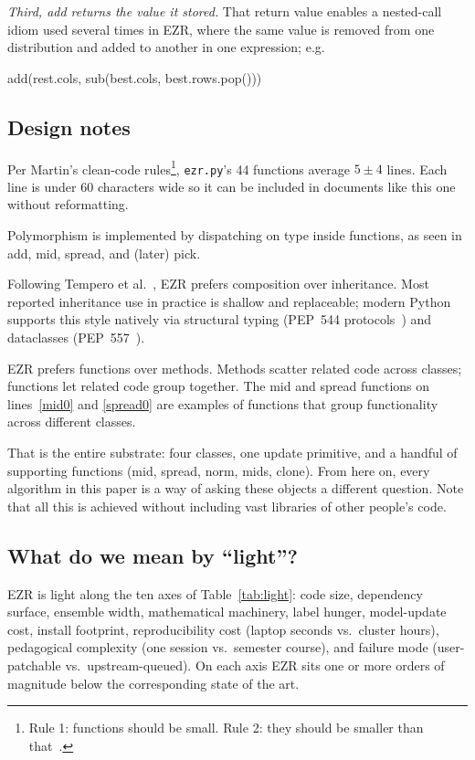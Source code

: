 \documentclass[AMA,STIX2COL]{WileyNJDv5}
\newcommand{\IT}{{\sffamily EZR}}
\begin{document}
\textit{Third, \textsf{add} returns the value it stored.} That
return value enables a nested-call idiom used several times in
\IT{}, where the same value is removed from one distribution
and added to another in one expression; e.g.
\begin{repl}
add(rest.cols, sub(best.cols, best.rows.pop()))
\end{repl}

\subsection{Design notes}

Per Martin's clean-code rules\footnote{Rule 1: functions
should be small. Rule 2: they should be smaller than
that~\cite{martin2009clean}.}, \texttt{ezr.py}'s 44 functions
average $5\pm4$ lines. Each line is under 60 characters wide
so it can be included in documents like this one without
reformatting.

Polymorphism is implemented by dispatching on type
inside functions, as seen in \textsf{add}, \textsf{mid},
\textsf{spread}, and (later) \textsf{pick}.

Following Tempero et al.\ \cite{tempero13},
  \IT{} prefers composition over inheritance. Most reported
  inheritance use in practice is shallow and replaceable; modern
  Python supports this style natively via structural typing
  (PEP~544 protocols~\cite{pep544}) and dataclasses
  (PEP~557~\cite{pep557}).

\IT{} prefers functions over methods. Methods scatter
related code across classes; functions let related code group
together. The \textsf{mid} and \textsf{spread} functions on
lines~\ref{mid0} and \ref{spread0} are examples of functions
that group functionality across different classes.

That is the entire substrate: four classes, one update
primitive, and a handful of supporting functions
(\textsf{mid}, \textsf{spread}, \textsf{norm}, \textsf{mids},
\textsf{clone}). From here on, every algorithm in this paper
is a way of asking these objects a different question. Note
that all this is achieved without including vast libraries
of other people's code.

\subsection{What do we mean by ``light''?}\label{sec:light}

\IT{} is light along the ten axes of Table~\ref{tab:light}:
code size, dependency surface, ensemble width, mathematical
machinery, label hunger, model-update cost, install footprint,
reproducibility cost (laptop seconds vs.\ cluster hours),
pedagogical complexity (one session vs.\ semester course), and
failure mode (user-patchable vs.\ upstream-queued). On each
axis \IT{} sits one or more orders of magnitude below the
corresponding state of the art. 
\end{document}
